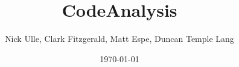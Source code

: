 \documentclass[12pt]{article}
\begin{document}
%

\title{CodeAnalysis}
\date{\today}
\author{Nick Ulle, Clark Fitzgerald, Matt Espe, Duncan Temple Lang}
\maketitle










\end{document}
